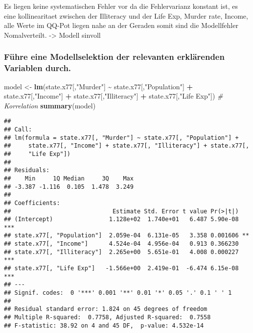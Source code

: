 \documentclass[
]{article}
\newenvironment{Shaded}{\begin{snugshade}}{\end{snugshade}}
\newcommand{\CommentTok}[1]{\textcolor[rgb]{0.56,0.35,0.01}{\textit{#1}}}
\newcommand{\FunctionTok}[1]{\textcolor[rgb]{0.13,0.29,0.53}{\textbf{#1}}}
\newcommand{\NormalTok}[1]{#1}
\newcommand{\OtherTok}[1]{\textcolor[rgb]{0.56,0.35,0.01}{#1}}
\newcommand{\SpecialCharTok}[1]{\textcolor[rgb]{0.81,0.36,0.00}{\textbf{#1}}}
\newcommand{\StringTok}[1]{\textcolor[rgb]{0.31,0.60,0.02}{#1}}
\begin{document}
Es liegen keine systematischen Fehler vor da die Fehlervarianz konstant
ist, es eine kollinearitaet zwischen der Illiteracy und der Life Exp,
Murder rate, Income, alle Werte im QQ-Pot liegen nahe an der Geraden
somit sind die Modellfehler Nomalverteilt. -\textgreater{} Modell
sinvoll

\subsubsection{Führe eine Modellselektion der relevanten erklärenden
Variablen
durch.}\label{fuxfchre-eine-modellselektion-der-relevanten-erkluxe4renden-variablen-durch.}

\begin{Shaded}
\begin{Highlighting}[]
\NormalTok{model }\OtherTok{\textless{}{-}}  \FunctionTok{lm}\NormalTok{(state.x77[,}\StringTok{"Murder"}\NormalTok{] }\SpecialCharTok{\textasciitilde{}}\NormalTok{ state.x77[,}\StringTok{"Population"}\NormalTok{] }\SpecialCharTok{+}\NormalTok{ state.x77[,}\StringTok{"Income"}\NormalTok{] }\SpecialCharTok{+}\NormalTok{ state.x77[,}\StringTok{"Illiteracy"}\NormalTok{] }\SpecialCharTok{+}\NormalTok{ state.x77[,}\StringTok{"Life Exp"}\NormalTok{])}
\CommentTok{\# Korrelation}
\FunctionTok{summary}\NormalTok{(model)}
\end{Highlighting}
\end{Shaded}

\begin{verbatim}
## 
## Call:
## lm(formula = state.x77[, "Murder"] ~ state.x77[, "Population"] + 
##     state.x77[, "Income"] + state.x77[, "Illiteracy"] + state.x77[, 
##     "Life Exp"])
## 
## Residuals:
##    Min     1Q Median     3Q    Max 
## -3.387 -1.116  0.105  1.478  3.249 
## 
## Coefficients:
##                             Estimate Std. Error t value Pr(>|t|)    
## (Intercept)                1.128e+02  1.740e+01   6.487 5.90e-08 ***
## state.x77[, "Population"]  2.059e-04  6.131e-05   3.358 0.001606 ** 
## state.x77[, "Income"]      4.524e-04  4.956e-04   0.913 0.366230    
## state.x77[, "Illiteracy"]  2.265e+00  5.651e-01   4.008 0.000227 ***
## state.x77[, "Life Exp"]   -1.566e+00  2.419e-01  -6.474 6.15e-08 ***
## ---
## Signif. codes:  0 '***' 0.001 '**' 0.01 '*' 0.05 '.' 0.1 ' ' 1
## 
## Residual standard error: 1.824 on 45 degrees of freedom
## Multiple R-squared:  0.7758, Adjusted R-squared:  0.7558 
## F-statistic: 38.92 on 4 and 45 DF,  p-value: 4.532e-14
\end{verbatim}
\end{document}
